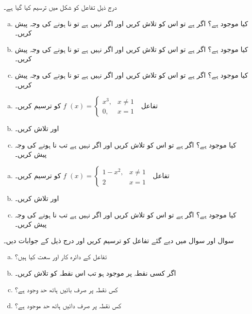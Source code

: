 درج ذیل تفاعل کو شکل  میں ترسیم کیا گیا ہے۔
\begin{enumerate}[a.]
\item
کیا  موجود ہے؟ اگر ہے تو اس کو تلاش کریں اور اگر نہیں ہے تو نا ہونے کی وجہ پیش کریں۔
\item
کیا  موجود ہے؟ اگر ہے تو اس کو تلاش کریں اور اگر نہیں ہے تو نا ہونے کی وجہ پیش کریں۔
\item
کیا  موجود ہے؟ اگر ہے تو اس کو تلاش کریں اور اگر نہیں ہے تو نا ہونے کی وجہ پیش کریں۔
\end{enumerate}
\begin{enumerate}[a.]
\item
تفاعل
$f\,\,(x)=\begin{cases} x^3,&x\ne 1\\ 0,&x=1 \,\,\end{cases}$
کو ترسیم کریں۔
\item
{} اور  تلاش کریں۔
\item
کیا  موجود ہے؟ اگر ہے تو اس کو تلاش کریں اور اگر نہیں ہے تب نا ہونے کی وجہ پیش کریں۔
\end{enumerate}
\begin{enumerate}[a.]
\item
تفاعل
$f\,\,(x)=\begin{cases} 1-x^2,&x\ne 1\\ 2&x=1 \,\,\end{cases}$
کو ترسیم کریں۔
\item
{} اور  تلاش کریں۔
\item
کیا  موجود ہے؟ اگر ہے تو اس کو تلاش کریں اور اگر نہیں ہے تب نا ہونے کی وجہ پیش کریں۔
\end{enumerate}
سوال  اور سوال  میں دیے گئے تفاعل کو ترسیم کریں اور درج ذیل کے جوابات دیں۔
\begin{enumerate}[a.]
\item
تفاعل  کے دائرہ کار اور سعت کیا ہیں؟
\item
اگر کسی نقطہ  پر  موجود ہو تب اس نقطہ کو تلاش کریں۔
\item
کس نقطہ پر صرف بائیں ہاتھ حد وجود ہے؟
\item
کس نقطہ پر صرف دائیں ہاتھ حد موجود ہے؟
\end{enumerate}

